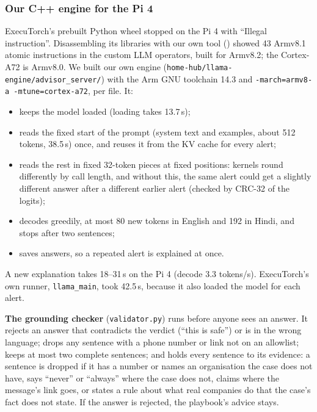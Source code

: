 \documentclass[11pt,a4paper]{article}
\newcommand{\code}[1]{\texttt{#1}}
\begin{document}
\subsubsection*{Our C++ engine for the Pi 4}
\label{sec:engine}

ExecuTorch's prebuilt Python wheel stopped on the Pi 4 with ``Illegal instruction''. Disassembling its libraries with our
own tool () showed 43 Armv8.1 atomic instructions in the custom LLM operators,
built for Armv8.2; the Cortex-A72 is Armv8.0. We built our own engine (\code{home-hub/llama-engine/advisor\_server/}) with the Arm GNU
toolchain 14.3 and \code{-march=armv8-a -mtune=cortex-a72}, per file. It:
\begin{itemize}
  \item keeps the model loaded (loading takes 13.7\,s);
  \item reads the fixed start of the prompt (system text and examples, about 512 tokens, 38.5\,s) once, and reuses
        it from the KV cache for every alert;
  \item reads the rest in fixed 32-token pieces at fixed positions: kernels round differently by call length, and
        without this, the same alert could get a slightly different answer after a different earlier alert
        (checked by CRC-32 of the logits);
  \item decodes greedily, at most 80 new tokens in English and 192 in Hindi, and stops after two sentences;
  \item saves answers, so a repeated alert is explained at once.
\end{itemize}
A new explanation takes 18--31\,s on the Pi 4 (decode 3.3 tokens/s). ExecuTorch's own runner,
\code{llama\_main}, took 42.5\,s, because it also loaded the model for each alert.

\textbf{The grounding checker} (\code{validator.py}) runs before anyone sees an answer. It rejects an answer that
contradicts the verdict (``this is safe'') or is in the wrong language; drops any sentence with a phone number or link not
on an allowlist; keeps at most two complete sentences; and holds every sentence to its evidence: a sentence is dropped if
it has a number or names an organisation the case does not have, says ``never'' or ``always'' where the case does not,
claims where the message's link goes, or states a rule about what real companies do that the case's fact does not state.
If the answer is rejected, the playbook's advice stays.
\end{document}
